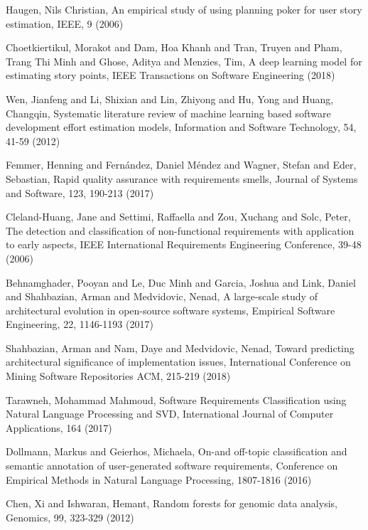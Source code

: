 \begin{thebibliography}{}
Haugen, Nils Christian, An empirical study of using planning poker for user story estimation, IEEE, 9 (2006)

Choetkiertikul, Morakot and Dam, Hoa Khanh and Tran, Truyen and Pham, Trang Thi Minh and Ghose, Aditya and Menzies, Tim, A deep learning model for estimating story points, IEEE Transactions on Software Engineering (2018)

Wen, Jianfeng and Li, Shixian and Lin, Zhiyong and Hu, Yong and Huang, Changqin, Systematic literature review of machine learning based software development effort estimation models, Information and Software Technology, 54, 41-59 (2012)

Femmer, Henning and Fern{\'a}ndez, Daniel M{\'e}ndez and Wagner, Stefan and Eder, Sebastian, Rapid quality assurance with requirements smells, Journal of Systems and Software, 123, 190-213 (2017)

Cleland-Huang, Jane and Settimi, Raffaella and Zou, Xuchang and Solc, Peter, The detection and classification of non-functional requirements with application to early aspects, IEEE International Requirements Engineering Conference, 39-48 (2006)

Behnamghader, Pooyan and Le, Duc Minh and Garcia, Joshua and Link, Daniel and Shahbazian, Arman and Medvidovic, Nenad, A large-scale study of architectural evolution in open-source software systems, Empirical Software Engineering, 22, 1146-1193 (2017)

Shahbazian, Arman and Nam, Daye and Medvidovic, Nenad, Toward predicting architectural significance of implementation issues, International Conference on Mining Software Repositories ACM, 215-219 (2018)

Tarawneh, Mohammad Mahmoud, Software Requirements Classification using Natural Language Processing and SVD, International Journal of Computer Applications, 164 (2017)

Dollmann, Markus and Geierhos, Michaela, On-and off-topic classification and semantic annotation of user-generated software requirements, Conference on Empirical Methods in Natural Language Processing, 1807-1816 (2016)

Chen, Xi and Ishwaran, Hemant, Random forests for genomic data analysis, Genomics, 99, 323-329 (2012)


\end{thebibliography}

